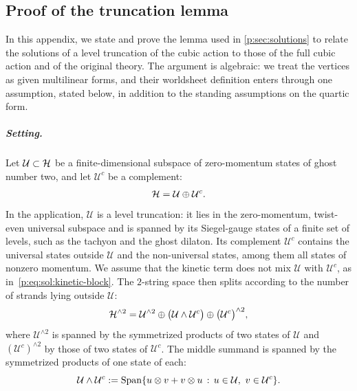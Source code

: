 \subsection{Proof of the truncation lemma}
\label{p:app:truncation}


In this appendix, we state and prove the lemma used in \cref{p:sec:solutions} to relate the solutions of a level truncation of the cubic action to those of the full cubic action and of the original theory.
The argument is algebraic: we treat the vertices as given multilinear forms, and their worldsheet definition enters through one assumption, stated below, in addition to the standing assumptions on the quartic form.

\subparagraph{Setting.}

Let $\mathcal U \subset \mathcal{H}$ be a finite-dimensional subspace of zero-momentum states of ghost number two, and let $\mathcal U^c$ be a complement:
\begin{equation}
  \label{p:eq:trunc:split-H}
  \mathcal{H}
    = \mathcal U \oplus \mathcal U^c.
\end{equation}
In the application, $\mathcal U$ is a level truncation: it lies in the zero-momentum, twist-even universal subspace and is spanned by its Siegel-gauge states of a finite set of levels, such as the tachyon and the ghost dilaton.
Its complement $\mathcal U^c$ contains the universal states outside $\mathcal U$ and the non-universal states, among them all states of nonzero momentum.
We assume that the kinetic term does not mix $\mathcal U$ with $\mathcal U^c$, as in~\eqref{p:eq:sol:kinetic-block}.
The $2$-string space then splits according to the number of strands lying outside $\mathcal U$:
\begin{equation}
  \label{p:eq:trunc:split-H2}
  \mathcal{H}^{\wedge 2}
    = \mathcal U^{\wedge 2}
      \oplus \big( \mathcal U \wedge \mathcal U^c \big)
      \oplus \big( \mathcal U^c \big)^{\wedge 2},
\end{equation}
where $\mathcal U^{\wedge 2}$ is spanned by the symmetrized products of two states of $\mathcal U$ and $(\mathcal U^c)^{\wedge 2}$ by those of two states of $\mathcal U^c$.
The middle summand is spanned by the symmetrized products of one state of each:
\begin{equation}
\label{p:eq:trunc:wedge}
\mathcal U \wedge \mathcal U^c
  := \operatorname{Span} \{ u \otimes v + v \otimes u \,:\, u \in \mathcal U, \ v \in \mathcal U^c \}.
\end{equation}

